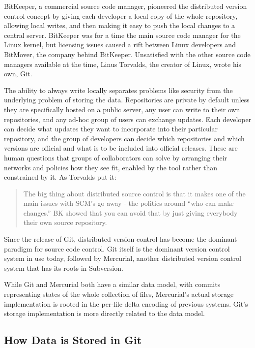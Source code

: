 BitKeeper, a commercial source code manager, pioneered the distributed version
control concept by giving each developer a local copy of the whole repository,
allowing local writes, and then making it easy to push the local changes to a
central server. BitKeeper was for a time the main source code manager for the
Linux kernel, but licensing issues caused a rift between Linux developers and
BitMover, the company behind BitKeeper. Unsatisfied with the other source code
managers available at the time, Linus Torvalds, the creator of Linux, wrote his
own, Git.

The ability to always write locally separates problems like security from the
underlying problem of storing the data. Repositories are private by default
unless they are specifically hosted on a public server, any user can write to
their own repositories, and any ad-hoc group of users can exchange updates. Each
developer can decide what updates they want to incorporate into their particular
repository, and the group of developers can decide which repositories and which
versions are official and what is to be included into official releases. These
are human questions that groups of collaborators can solve by arranging their
networks and policies how they see fit, enabled by the tool rather than
constrained by it. As Torvalds put it:

\blockcquote{git_10_years_interview}{The big thing about distributed source
    control is that it makes one of the main issues with SCM's go away - the
    politics around \enquote{who can make changes.} BK 
    showed that you can avoid that by just giving everybody their own source
repository. }


Since the release of Git, distributed version control has become the dominant
paradigm for source code control. Git itself is the dominant version control
system in use today, followed by Mercurial, another distributed version control
system that has its roots in Subversion.

While Git and Mercurial both have a similar data model, with commits
representing states of the whole collection of files, Mercurial's actual storage
implementation is rooted in the per-file delta encoding of previous systems.
Git's storage implementation is more directly related to the data model.

%


\subsection{How Data is Stored in Git}

